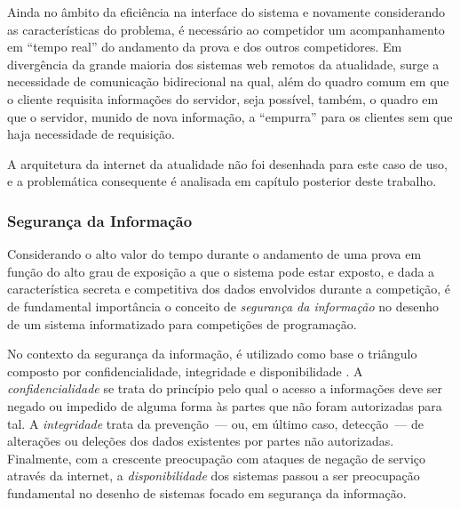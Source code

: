 \documentclass[ruledheader]{abnt}
\begin{document}
Ainda no âmbito da eficiência na interface do sistema e novamente considerando as características do problema, é necessário ao competidor um acompanhamento em ``tempo real'' do andamento da prova e dos outros competidores. Em divergência da grande maioria dos sistemas web remotos da atualidade, surge a necessidade de comunicação bidirecional na qual, além do quadro comum em que o cliente requisita informações do servidor, seja possível, também, o quadro em que o servidor, munido de nova informação, a ``empurra'' para os clientes sem que haja necessidade de requisição.

A arquitetura da internet da atualidade não foi desenhada para este caso de uso, e a problemática consequente é analisada em capítulo posterior deste trabalho.

\subsubsection{Segurança da Informação}

Considerando o alto valor do tempo durante o andamento de uma prova em função do alto grau de exposição a que o sistema pode estar exposto, e dada a característica secreta e competitiva dos dados envolvidos durante a competição, é de fundamental importância o conceito de \emph{segurança da informação} no desenho de um sistema informatizado para competições de programação.

No contexto da segurança da informação, é utilizado como base o triângulo composto por confidencialidade, integridade e disponibilidade \cite{stamp2011}. A \emph{confidencialidade} se trata do princípio pelo qual o acesso a informações deve ser negado ou impedido de alguma forma às partes que não foram autorizadas para tal. A \emph{integridade} trata da prevenção~--- ou, em último caso, detecção~--- de alterações ou deleções dos dados existentes por partes não autorizadas. Finalmente, com a crescente preocupação com ataques de negação de serviço através da internet, a \emph{disponibilidade} dos sistemas passou a ser preocupação fundamental no desenho de sistemas focado em segurança da informação.
\end{document}
